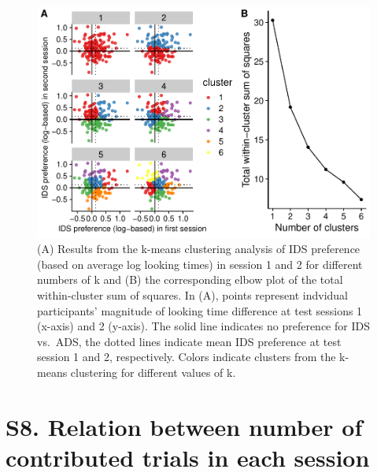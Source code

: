 \documentclass[
  man, donotrepeattitle,floatsintext]{apa6}
\begin{document}
\begin{figure}
\centering
\includegraphics{MB1T_supplement_files/figure-latex/fig6-1.pdf}
\caption{\label{fig:fig6} (A) Results from the k-means clustering analysis of IDS preference (based on average log looking times) in session 1 and 2 for different numbers of k and (B) the corresponding elbow plot of the total within-cluster sum of squares. In (A), points represent indvidual participants' magnitude of looking time difference at test sessions 1 (x-axis) and 2 (y-axis). The solid line indicates no preference for IDS vs.~ADS, the dotted lines indicate mean IDS preference at test session 1 and 2, respectively. Colors indicate clusters from the k-means clustering for different values of k.}
\end{figure}

\newpage

\hypertarget{s8.-relation-between-number-of-contributed-trials-in-each-session}{%
\section{S8. Relation between number of contributed trials in each session}\label{s8.-relation-between-number-of-contributed-trials-in-each-session}}
\end{document}
